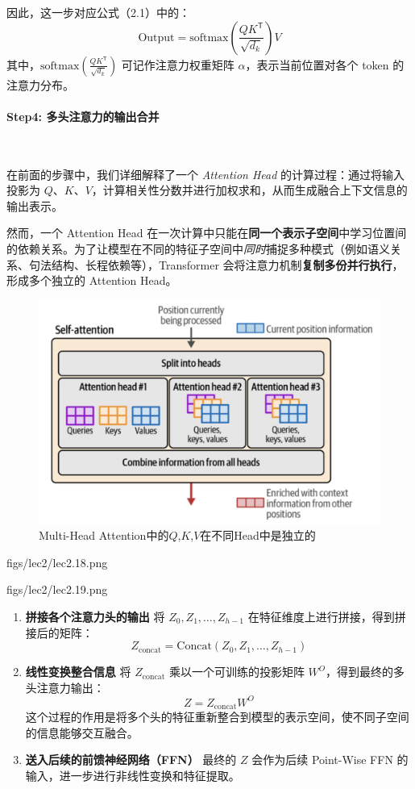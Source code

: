 因此，这一步对应公式（2.1）中的：
\[
\text{Output} = \text{softmax}\left(\frac{QK^\mathsf{T}}{\sqrt{d_k}}\right) V
\]
其中，\(\text{softmax}\left(\frac{QK^\mathsf{T}}{\sqrt{d_k}}\right)\) 可记作注意力权重矩阵 \(\alpha\)，表示当前位置对各个 token 的注意力分布。


\clearpage
\paragraph{Step4: 多头注意力的输出合并}~{}

在前面的步骤中，我们详细解释了一个 \emph{Attention Head} 的计算过程：通过将输入投影为 $Q$、$K$、$V$，计算相关性分数并进行加权求和，从而生成融合上下文信息的输出表示。  

然而，一个 Attention Head 在一次计算中只能在\textbf{同一个表示子空间}中学习位置间的依赖关系。为了让模型在不同的特征子空间中\emph{同时}捕捉多种模式（例如语义关系、句法结构、长程依赖等），Transformer 会将注意力机制\textbf{复制多份并行执行}，形成多个独立的 Attention Head。

\begin{figure}[htbp]
  \centering
  \includegraphics[width=0.8\linewidth]{figs/lec2/lec2.17.png}
  \caption{Multi-Head Attention中的$Q$,$K$,$V$在不同Head中是独立的}
  \label{fig:Multi-Head Attention计算图}
\end{figure}

\MarginImageWithNote
  {figs/lec2/lec2.18.png}
  {}


\MarginImageWithNote
  {figs/lec2/lec2.19.png}
  {}
  {
\begin{enumerate}
  \item \textbf{拼接各个注意力头的输出}  
  将 $Z_0, Z_1, \dots, Z_{h-1}$ 在特征维度上进行拼接，得到拼接后的矩阵：
  \[
  Z_{\text{concat}} = \text{Concat}(Z_0, Z_1, \dots, Z_{h-1})
  \]
  
  \item \textbf{线性变换整合信息}  
  将 $Z_{\text{concat}}$ 乘以一个可训练的投影矩阵 $W^O$，得到最终的多头注意力输出：
  \[
  Z = Z_{\text{concat}} W^O
  \]
  这个过程的作用是将多个头的特征重新整合到模型的表示空间，使不同子空间的信息能够交互融合。

  \item \textbf{送入后续的前馈神经网络（FFN）}  
  最终的 $Z$ 会作为后续 Point-Wise FFN 的输入，进一步进行非线性变换和特征提取。
\end{enumerate}
}

